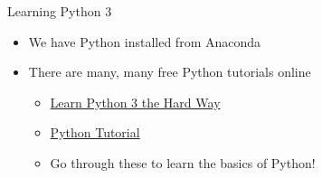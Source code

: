 \documentclass[11pt,professionalfonts]{beamer}
\begin{document}
\begin{frame}{Learning Python 3}
    \begin{itemize}
        \item We have Python installed from Anaconda
        \item There are many, many free Python tutorials online
            \begin{itemize}
                \item \href{https://learnpythonthehardway.org/python3/}{Learn Python 3 the Hard Way}
                \item \href{https://docs.python.org/3/tutorial/index.html}{Python Tutorial}
                \item Go through these to learn the basics of Python!
            \end{itemize}
    \end{itemize}
\end{frame}
\end{document}
